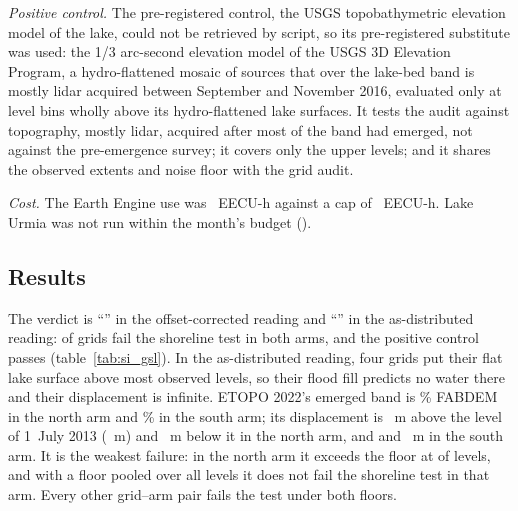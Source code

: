 \emph{Positive control.} The pre-registered control, the USGS topobathymetric elevation model of the lake\citep{root2023_gsl_tbdem}, could not be retrieved by script, so its pre-registered substitute was used: the 1/3 arc-second elevation model of the USGS 3D Elevation Program\citep{usgs_3dep10m}, a hydro-flattened mosaic of sources\citep{archuleta2017,usgs_3dep13_tiles} that over the lake-bed band is mostly lidar acquired between September and November 2016\citep{quantumspatial2017_gsl}, evaluated only at level bins wholly above its hydro-flattened lake surfaces. It tests the audit against topography, mostly lidar, acquired after most of the band had emerged, not against the pre-emergence survey; it covers only the upper levels; and it shares the observed extents and noise floor with the grid audit.

\emph{Cost.} The Earth Engine use was ~EECU-h against a cap of ~EECU-h. Lake Urmia was not run within the month's budget ().

\subsection*{Results}
The verdict is ``'' in the offset-corrected reading and ``'' in the as-distributed reading:  of  grids fail the shoreline test in both arms, and the positive control passes (table~\ref{tab:si_gsl}). In the as-distributed reading, four grids put their flat lake surface above most observed levels, so their flood fill predicts no water there and their displacement is infinite. ETOPO 2022's emerged band is \% FABDEM in the north arm and \% in the south arm; its displacement is ~m above the level of 1~July 2013 (~m) and ~m below it in the north arm, and  and ~m in the south arm. It is the weakest failure: in the north arm it exceeds the floor at  of  levels, and with a floor pooled over all levels it does not fail the shoreline test in that arm. Every other grid--arm pair fails the test under both floors.

